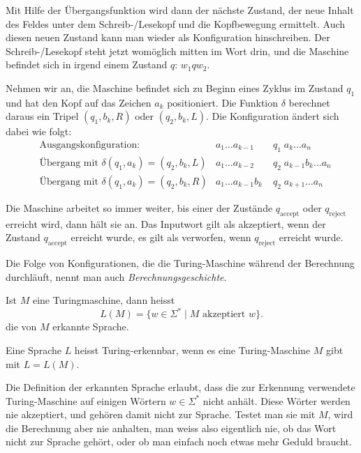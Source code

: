 Mit Hilfe der Übergangsfunktion wird dann der nächste Zustand,
der neue Inhalt des Feldes unter dem Schreib-/Lesekopf und die
Kopfbewegung ermittelt. Auch diesen neuen Zustand kann man wieder
als Konfiguration hinschreiben. Der Schreib-/Lesekopf steht
jetzt womöglich mitten im Wort drin, und die Maschine befindet
sich in irgend einem Zustand $q$: $w_1qw_2$.

Nehmen wir an, die Maschine befindet sich zu Beginn eines Zyklus im
Zustand $q_1$ und hat den Kopf auf das Zeichen $a_k$ positioniert.
Die Funktion $\delta$ berechnet daraus ein Tripel $(q_1,b_k,R)$
oder $(q_2,b_k,L)$. Die Konfiguration ändert sich dabei wie
folgt:
\begin{align*}
&\text{Ausgangskonfiguration:}&a_1\dots a_{k-1}&\;q_1\;a_k\dots a_n\\
&\text{Übergang mit } \delta(q_1,a_k)=(q_2,b_k,L)&a_1\dots a_{k-2}&\;q_2\;a_{k-1}b_k\dots a_n\\
&\text{Übergang mit } \delta(q_1,a_k)=(q_2,b_k,R)&a_1\dots a_{k-1}b_k&\;q_2\;a_{k+1}\dots a_n
\end{align*}

Die Maschine arbeitet so immer weiter, bis einer der Zustände $q_{\text{accept}}$
oder $q_{\text{reject}}$ erreicht wird, dann hält sie an.
Das Inputwort gilt als akzeptiert, wenn der Zustand $q_{\text{accept}}$
erreicht wurde, es gilt als verworfen, wenn $q_{\text{reject}}$ erreicht
wurde.

%
Die Folge von Konfigurationen, die die Turing-Maschine
während der Berechnung durchläuft, nennt man auch
{\em Berechnungsgeschichte}.

\begin{definition}
%
Ist $M$ eine Turingmaschine, dann heisst
\[
L(M)=\{w\in\Sigma^*\;|\;\text{$M$ akzeptiert $w$}\}.
\]
die von $M$ erkannte Sprache.
\end{definition}

\begin{definition}
%
Eine Sprache $L$ heisst Turing-erkennbar, wenn es eine Turing-Maschine
$M$ gibt mit $L=L(M)$.
\end{definition}

Die Definition der erkannten Sprache erlaubt, dass die zur Erkennung
verwendete Turing-Maschine auf einigen Wörtern $w\in\Sigma^*$ nicht
anhält. Diese Wörter werden nie akzeptiert, und gehören
damit nicht zur Sprache. Testet man sie mit $M$, wird die Berechnung
aber nie anhalten, man weiss also eigentlich nie, ob das Wort
nicht zur Sprache gehört, oder ob man einfach noch etwas mehr
Geduld braucht.

